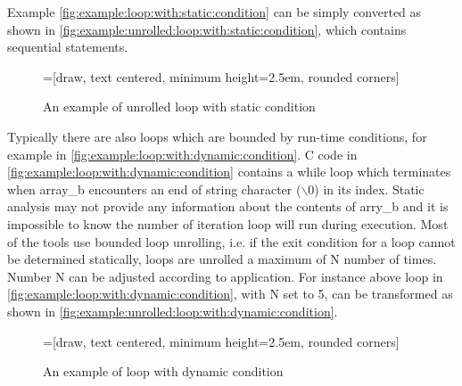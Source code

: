 Example \autoref{fig:example:loop:with:static:condition} can be simply converted as shown in \autoref{fig:example:unrolled:loop:with:static:condition}, which contains sequential statements.
\begin{figure}[htbp]
    \centering
    =[draw, text centered, minimum height=2.5em, rounded corners]

   \caption{An example of unrolled loop with static condition}
   \label{fig:example:unrolled:loop:with:static:condition}
\end{figure}

Typically there are also loops which are bounded by run-time conditions, for example in \autoref{fig:example:loop:with:dynamic:condition}. C code in \autoref{fig:example:loop:with:dynamic:condition} contains a while loop which terminates when array\_b encounters an end of string character ($\backslash 0$) in its index. Static analysis may not provide any information about the contents of arry\_b and it is impossible to know the number of iteration loop will run during execution. Most of the tools use bounded loop unrolling, i.e. if the exit condition for a loop cannot be determined statically, loops are unrolled a maximum of N number of times. Number N can be adjusted according to application. For instance above loop in \autoref{fig:example:loop:with:dynamic:condition}, with N set to 5, can be transformed as shown in \autoref{fig:example:unrolled:loop:with:dynamic:condition}.
\begin{figure}[htbp]
    \centering
    =[draw, text centered, minimum height=2.5em, rounded corners]

   \caption{An example of loop with dynamic condition}
   \label{fig:example:loop:with:dynamic:condition}
\end{figure}


